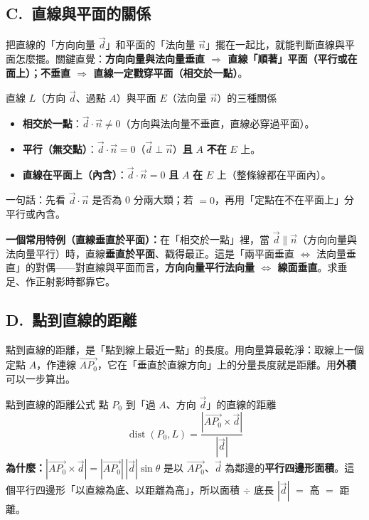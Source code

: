 \documentclass[11pt]{article}
\begin{document}
\subsection*{\sffamily C.\ 直線與平面的關係}

把直線的「方向向量 $\vec d$」和平面的「法向量 $\vec n$」擺在一起比，就能判斷直線與平面怎麼擺。關鍵直覺：\textbf{方向向量與法向量垂直 $\Rightarrow$ 直線「順著」平面（平行或在面上）；不垂直 $\Rightarrow$ 直線一定戳穿平面（相交於一點）}。


\begin{補充框}{直線 $L$（方向 $\vec d$、過點 $A$）與平面 $E$（法向量 $\vec n$）的三種關係}
\begin{itemize}\setlength{\itemsep}{2pt}
\item \textbf{相交於一點}：$\vec d\cdot\vec n\ne 0$（方向與法向量不垂直，直線必穿過平面）。
\item \textbf{平行（無交點）}：$\vec d\cdot\vec n=0$（$\vec d\perp\vec n$）\textbf{且} $A$ \textbf{不在} $E$ 上。
\item \textbf{直線在平面上（內含）}：$\vec d\cdot\vec n=0$ \textbf{且} $A$ \textbf{在} $E$ 上（整條線都在平面內）。
\end{itemize}
一句話：先看 $\vec d\cdot\vec n$ 是否為 0 分兩大類；若 $=0$，再用「定點在不在平面上」分平行或內含。
\end{補充框}

\textbf{一個常用特例（直線垂直於平面）：}在「相交於一點」裡，當 $\vec d\parallel\vec n$（方向向量與法向量平行）時，直線\textbf{垂直於平面}、戳得最正。這是「兩平面垂直 $\iff$ 法向量垂直」的對偶——對直線與平面而言，\textbf{方向向量平行法向量 $\iff$ 線面垂直}。求垂足、作正射影時都靠它。

\subsection*{\sffamily D.\ 點到直線的距離}

點到直線的距離，是「點到線上最近一點」的長度。用向量算最乾淨：取線上一個定點 $A$，作連線 $\vec{AP_0}$，它在「垂直於直線方向」上的分量長度就是距離。用\textbf{外積}可以一步算出。

\begin{補充框}{點到直線的距離公式}
點 $P_0$ 到「過 $A$、方向 $\vec d$」的直線的距離
$$\boxed{\;\operatorname{dist}(P_0,L)=\frac{|\vec{AP_0}\times\vec d|}{|\vec d|}\;}$$
\textbf{為什麼：}$|\vec{AP_0}\times\vec d|=|\vec{AP_0}|\,|\vec d|\sin\theta$ 是以 $\vec{AP_0}$、$\vec d$ 為鄰邊的\textbf{平行四邊形面積}。這個平行四邊形「以直線為底、以距離為高」，所以面積 $\div$ 底長 $|\vec d|$ $=$ 高 $=$ 距離。
\end{補充框}
\end{document}
